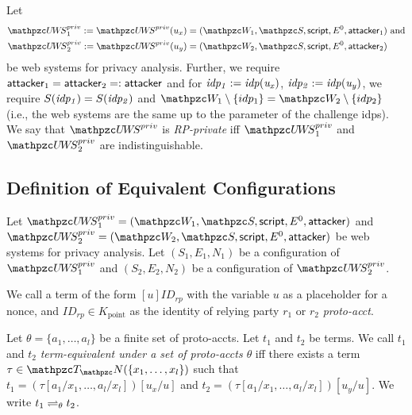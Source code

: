 \begin{theorem}
  \begin{definition}[RP-Privacy]\label{def:rp-privacy}
    Let 
    \begin{align*}
      \uppressoprivwebsystem_1 := \uppressoprivwebsystem(u_x) =
      (\bidsystem_1, \scriptset, \mathsf{script}, E^0, \fAP{attacker}_1)&\text{ and}\\
      \uppressoprivwebsystem_2 := \uppressoprivwebsystem(u_y) =
      (\bidsystem_2, \scriptset, \mathsf{script}, E^0, \fAP{attacker}_2)&
    \end{align*}
    be \uppresso web systems for privacy analysis. 
    Further, we require $\mathsf{attacker}_1 = \mathsf{attacker}_2 =: \mathsf{attacker}$ 
    and for $\mathit{idp_1} := \mathit{idp(u_x)}$, $\mathit{idp_2} := \mathit{idp(u_y)}$, 
    we require $S(\mathit{idp_1}) = S(\mathit{idp_2})$ and $\bidsystem_1 \setminus \{idp_1\} = \bidsystem_2 \setminus \{idp_2\}$ 
    (i.e., the web systems are the same up to the parameter of the challenge idps).  
    We say that $\uppressoprivwebsystem$ is \emph{RP-private} iff $\uppressoprivwebsystem_1$ and $\uppressoprivwebsystem_2$ are indistinguishable.
  \end{definition}
  
  \subsection{Definition of Equivalent Configurations}\label{app:rp:defin-equiv-stat}
  
  Let $\uppressoprivwebsystem_1 = (\bidsystem_1, \scriptset, \mathsf{script}, E^0, \fAP{attacker})$ 
  and $\uppressoprivwebsystem_2 = (\bidsystem_2, \scriptset, \mathsf{script}, E^0, \fAP{attacker})$ 
  be \uppresso web systems for privacy analysis. 
  Let $(S_1,E_1,N_1)$ be a configuration of $\uppressoprivwebsystem_1$ 
  and $(S_2,E_2,N_2)$ be a configuration of $\uppressoprivwebsystem_2$.
  
  \begin{definition}
    We call a term of the form $[u]ID_{rp}$ with the variable
    $u$ as a placeholder for a nonce, and 
    $ID_{rp}\in K_\text{point}$ as the identity of 
    relying party $r_1$ or $r_2$ \emph{proto-acct}.
  \end{definition}
  
  \begin{definition}
    Let $\theta = \{a_1, \ldots, a_l \}$ be a finite set of proto-accts.
    Let $t_1$ and $t_2$ be terms. We call $t_1$ and $t_2$
    \emph{term-equivalent under a set of proto-accts $\theta$} 
    iff there exists a term $\tau \in \terms(\{x_1,\dots,x_l\})$ such that
    $t_1 = (\tau [ a_1 / x_1 , \dots , a_l / x_l ])[ u_x / u ]$ and
    $t_2 = (\tau [ a_1 / x_1 , \dots , a_l / x_l ])[ u_y / u ]$.
    We write $t_1 \rightleftharpoons_{\theta} t_2$.
  

\end{definition}
\end{theorem}
